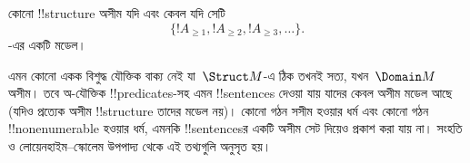\documentclass[../../../include/open-logic-section]{subfiles}
\begin{document}
\begin{prop}
কোনো !!{structure} অসীম যদি এবং কেবল যদি সেটি
\[
\{!A_{\ge 1}, !A_{\ge 2}, !A_{\ge 3}, \dots \}.
\]
-এর একটি মডেল।
\end{prop}

এমন কোনো একক বিশুদ্ধ যৌক্তিক বাক্য নেই যা~$\Struct M$-এ ঠিক তখনই সত্য,
যখন~$\Domain M$ অসীম। তবে অ-যৌক্তিক !!{predicate}s-সহ এমন
!!{sentence}s দেওয়া যায় যাদের কেবল অসীম মডেল আছে (যদিও প্রত্যেক অসীম
!!{structure} তাদের মডেল নয়)। কোনো গঠন সসীম হওয়ার ধর্ম এবং কোনো গঠন
!!{nonenumerable} হওয়ার ধর্ম, এমনকি !!{sentence}sর একটি অসীম সেট
দিয়েও প্রকাশ করা যায় না। সংহতি ও লোয়েনহাইম--স্কোলেম উপপাদ্য থেকে
এই তথ্যগুলি অনুসৃত হয়।
\end{document}

